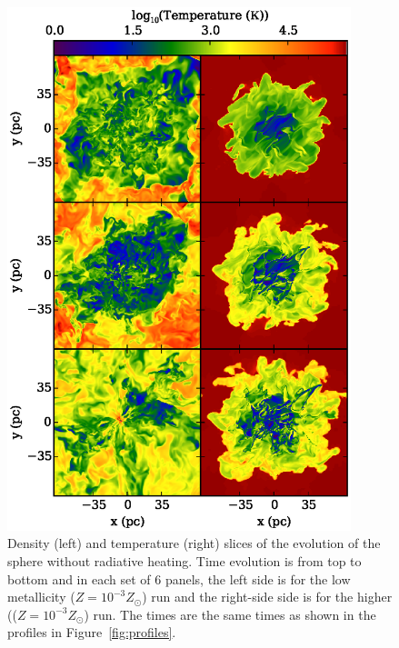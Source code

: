 \documentclass[useAMS,usenatbib]{mn2e}
\begin{document}
\begin{figure}
\begin{center}
\includegraphics[width=10cm]{Images/temperature_panel} \hspace{-2cm} 
\end{center}
\caption{\label{fig:number_density_panel} Density (left) and temperature (right) slices of the evolution of the sphere without radiative heating.  Time evolution is from top to bottom and in each set of 6 panels, the left side is for the low metallicity ($Z=10^{-3}Z_\odot$) run and the right-side side is for the higher (($Z=10^{-3}Z_\odot$) run.  The times are the same times as shown in the profiles in Figure~\ref{fig:profiles}.  }
\end{figure}
\end{document}
